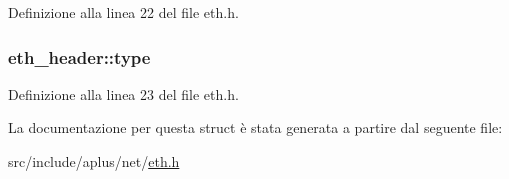 Definizione alla linea 22 del file eth.\+h.

\hypertarget{structeth__header_a1f44bfea959183d53e42185c107fa7c0}{
\subsubsection[{type}]{ eth\+\_\+header\+::type}}\label{structeth__header_a1f44bfea959183d53e42185c107fa7c0}


Definizione alla linea 23 del file eth.\+h.



La documentazione per questa struct è stata generata a partire dal seguente file\+:\begin{DoxyCompactItemize}
\item 
src/include/aplus/net/\hyperlink{eth_8h}{eth.\+h}\end{DoxyCompactItemize}

